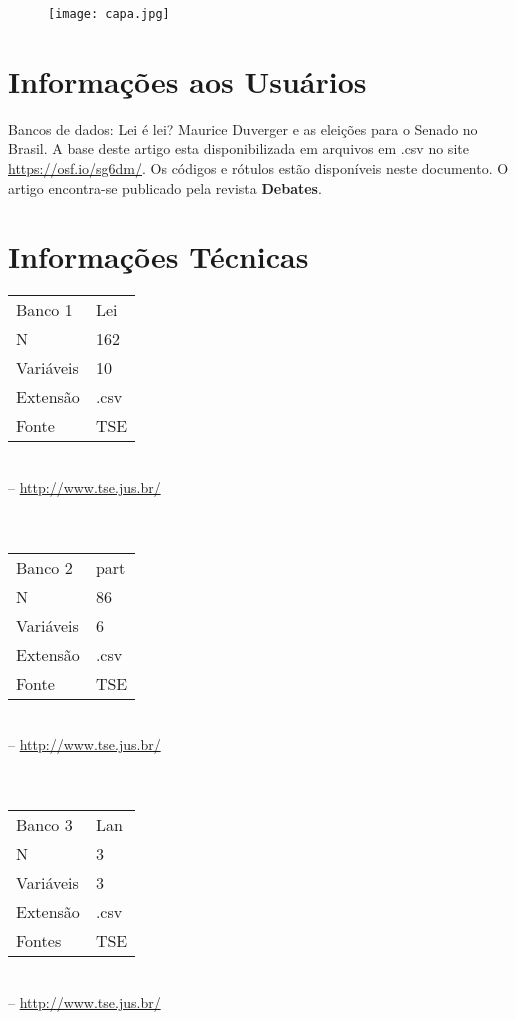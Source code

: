 \documentclass{article}\usepackage[]{graphicx}\usepackage[]{color}
\begin{document}
\begin{figure}[!h]
	\centering
	\texttt{[image: capa.jpg]}
	
\end{figure}







\tableofcontents
\pagebreak


	\section{Informações aos Usuários}
	Bancos de dados: Lei é lei? Maurice Duverger e as eleições para o Senado no Brasil.
	A base deste artigo esta disponibilizada em arquivos em .csv no site {\color{red}\url{https://osf.io/sg6dm/}}. Os códigos e rótulos estão disponíveis neste documento. O artigo encontra-se publicado pela revista \textbf{Debates}.


	\section{Informações Técnicas}
	\begin{tabular}{p{3cm} p{10cm}}
		Banco 1     & Lei \\
		N           &  162 \\
		Variáveis   &  10 \\
		Extensão    & .csv \\
		Fonte       & TSE  \\
	\end{tabular} \\
   -- {\color{blue}\url{http://www.tse.jus.br/}}
 \\ \\ \\
	\begin{tabular}{p{3cm} p{10cm}}
		Banco 2      & part \\
		N           &  86 \\
		Variáveis   &  6 \\
		Extensão    & .csv \\
		Fonte       & TSE
	\end{tabular} \\
-- {\color{blue}\url{http://www.tse.jus.br/}} \\
\\ \\
	\begin{tabular}{p{3cm} p{10cm}}
		Banco 3     & Lan \\
		N           &  3 \\
		Variáveis   &  3 \\
		Extensão    & .csv \\
		Fontes      &  TSE 	\end{tabular} \\
	-- {\color{blue}\url{http://www.tse.jus.br/}} \\
\end{document}
